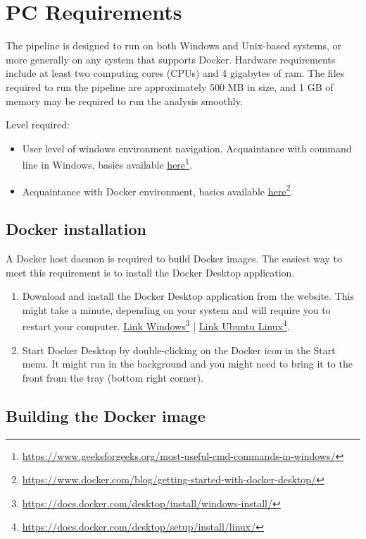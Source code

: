 \documentclass{ol-softwaremanual}
\newcommand{\doclink}[2]{\href{#1}{#2}\footnote{\url{#1}}}
\begin{document}
\FloatBarrier

\section{PC Requirements}

The pipeline is designed to run on both Windows and Unix-based systems, or more generally on any system that supports Docker. Hardware requirements include at least two computing cores (CPUs) and 4 gigabytes of ram. The files required to run the pipeline are approximately 500 MB in size, and 1 GB of memory may be required to run the analysis smoothly.

Level required:
\begin{itemize}
	\item User level of windows environment navigation. Acquaintance with command line in Windows, basics available \doclink{https://www.geeksforgeeks.org/most-useful-cmd-commands-in-windows/}{here}.
	\item Acquaintance with Docker environment, basics available \doclink{https://www.docker.com/blog/getting-started-with-docker-desktop/}{here}.
\end{itemize}

\subsection{Docker installation}
A Docker host daemon is required to build Docker images. The easiest way to meet this requirement is to install the Docker Desktop application.

\begin{enumerate}
	\item Download and install the Docker Desktop application from the website. This might take a minute, depending on your system and will require you to restart your computer. \doclink{https://docs.docker.com/desktop/install/windows-install/}{Link Windows} | \doclink{https://docs.docker.com/desktop/setup/install/linux/}{Link Ubuntu Linux}.
	\item Start Docker Desktop by double-clicking on the Docker icon in the Start menu. It might run in the background and you might need to bring it to the front from the tray (bottom right corner).
\end{enumerate}

\subsection{Building the Docker image}
\end{document}
